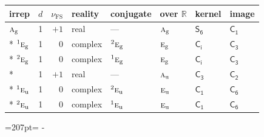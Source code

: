\documentclass[10pt,a4paper]{article}
\newcommand{\needspace}[1]{\par\penalty-100\begingroup\dimen0=#1\relax\dimen2=\pagegoal
  \advance\dimen2-\pagetotal\ifdim\dimen0>\dimen2\relax\ifdim\dimen2>0pt\vfil\break\fi\fi
  \endgroup}
\numberwithin{equation}{section}
\newcommand{\grp}[1]{\mathsf{#1}}
\newcommand{\irr}[1]{\text{\normalfont\scshape #1}}
\newcommand{\conjpair}[1]{{}^{#1}}
\newcommand{\detbox}[1]{{\setlength{\fboxsep}{1pt}\fbox{#1}}}
\newcommand{\ptag}[1]{\mathrm{#1}}
\newcommand{\fsind}{\nu_{\mathrm{FS}}}
\begin{document}
{\small\renewcommand{\arraystretch}{1.25}\setlength{\tabcolsep}{4pt}\begin{longtable}{@{}lrrlllll@{}}\toprule
irrep & $d$ & $\fsind$ & reality & conjugate & over $\mathbb{R}$ & kernel & image\\\midrule\endhead
\bottomrule\endfoot\endlastfoot
$\irr{a}_{\ptag{g}}$ & 1 & $+1$ & real & --- & $\irr{a}_{\ptag{g}}$ & \href{S6.pdf}{$\grp{S_{6}}$} & \href{../../../rotation/data/pdf/C1.pdf}{$\grp{C_{1}}$}\\*
$\conjpair{1}\irr{e}_{\ptag{g}}$ & 1 & $0$ & complex & $\conjpair{2}\irr{e}_{\ptag{g}}$ & $\irr{e}_{\ptag{g}}$ & \href{S2.pdf}{$\grp{C_{i}}$} & \href{../../../rotation/data/pdf/C3.pdf}{$\grp{C_{3}}$}\\*
$\conjpair{2}\irr{e}_{\ptag{g}}$ & 1 & $0$ & complex & $\conjpair{1}\irr{e}_{\ptag{g}}$ & $\irr{e}_{\ptag{g}}$ & \href{S2.pdf}{$\grp{C_{i}}$} & \href{../../../rotation/data/pdf/C3.pdf}{$\grp{C_{3}}$}\\*
\detbox{$\irr{a}_{\ptag{u}}$} & 1 & $+1$ & real & --- & $\irr{a}_{\ptag{u}}$ & \href{C3.pdf}{$\grp{C_{3}}$} & \href{../../../rotation/data/pdf/C2.pdf}{$\grp{C_{2}}$}\\*
$\conjpair{1}\irr{e}_{\ptag{u}}$ & 1 & $0$ & complex & $\conjpair{2}\irr{e}_{\ptag{u}}$ & $\irr{e}_{\ptag{u}}$ & \href{C1.pdf}{$\grp{C_{1}}$} & \href{../../../rotation/data/pdf/C6.pdf}{$\grp{C_{6}}$}\\*
$\conjpair{2}\irr{e}_{\ptag{u}}$ & 1 & $0$ & complex & $\conjpair{1}\irr{e}_{\ptag{u}}$ & $\irr{e}_{\ptag{u}}$ & \href{C1.pdf}{$\grp{C_{1}}$} & \href{../../../rotation/data/pdf/C6.pdf}{$\grp{C_{6}}$}\\
\bottomrule\end{longtable}}
\needspace{207pt}
\end{document}
